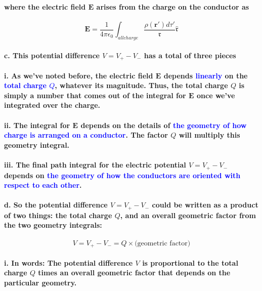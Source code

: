 \documentclass{article}
\begin{document}
\paragraph{\indent where the electric field $\boldsymbol{E}$ arises from the charge on the conductor as}
\begin{equation*}
    \boldsymbol{E}=\frac{1}{4\pi\epsilon_0}\int_{all charge}\frac{\rho(\boldsymbol{r}')d\tau'}{\mathfrak{r}}\hat{\boldsymbol{\mathfrak{r}}}
\end{equation*}
\paragraph{\indent c. This potential difference $V=V_+-V_-$ has a total of three pieces}
\paragraph{\indent\indent i. As we've noted before, the electric field $\boldsymbol{E}$ depends \textcolor{blue}{linearly} on the \textcolor{blue}{total charge $Q$}, whatever its magnitude. Thus, the total charge $Q$ is simply a number that comes out of the integral for $\boldsymbol{E}$ once we've integrated over the charge.}
\paragraph{\indent\indent ii. The integral for $\boldsymbol{E}$ depends on the details of \textcolor{blue}{the geometry of how charge is arranged on a conductor}. The factor $Q$ will multiply this geometry integral.}
\paragraph{\indent\indent iii. The final path integral for the electric potential $V=V_+-V_-$ depends on \textcolor{blue}{the geometry of how the conductors are oriented with respect to each other}.}
\paragraph{\indent d. So the potential difference $V=V_+-V_-$ could be written as a product of two things: the total charge $Q$, and an overall geometric factor from the two geometry integrals:}
\begin{equation*}
    V=V_+-V_-=Q\times\text{(geometric factor)}
\end{equation*}
\paragraph{\indent\indent i. In words: The potential difference $V$ is proportional to the total charge $Q$  times an overall geometric factor that depends on the particular geometry.}
\end{document}
